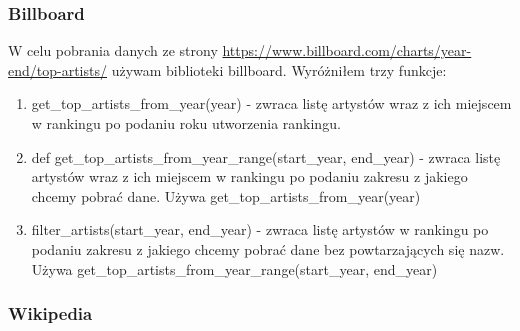 \documentclass[12pt, letterpaper]{article}
\begin{document}
\subsubsection{Billboard}

W celu pobrania danych ze strony \url{https://www.billboard.com/charts/year-end/top-artists/} używam biblioteki billboard. Wyróżniłem trzy funkcje:
\begin{enumerate}
    \item get\_top\_artists\_from\_year(year) - zwraca listę artystów wraz z ich miejscem w rankingu po podaniu roku utworzenia rankingu.
    \item def get\_top\_artists\_from\_year\_range(start\_year, end\_year) - zwraca listę artystów wraz z ich miejscem w rankingu po podaniu zakresu z jakiego chcemy pobrać dane. Używa get\_top\_artists\_from\_year(year)
    \item filter\_artists(start\_year, end\_year) - zwraca listę artystów w rankingu po podaniu zakresu z jakiego chcemy pobrać dane bez powtarzających się nazw. Używa get\_top\_artists\_from\_year\_range(start\_year, end\_year)
\end{enumerate}

\subsubsection{Wikipedia}
\end{document}
